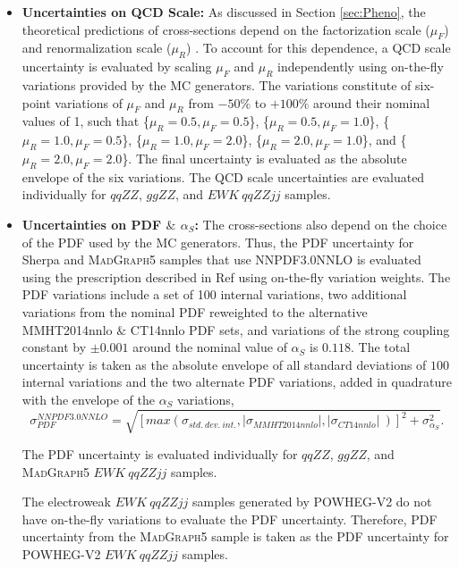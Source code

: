 \begin{itemize}
\item{\textbf{Uncertainties on QCD Scale:} As discussed in Section \ref{sec:Pheno}, the theoretical predictions of cross-sections depend on the factorization scale ($\mu_{F}$) and renormalization scale ($\mu_{R}$) \cite{QCDScaleAndPDFUnc}. To account for this dependence, a QCD scale uncertainty is evaluated by scaling $\mu_{F}$ and $\mu_{R}$ independently using on-the-fly variations provided by the MC generators. The variations constitute of six-point variations of $\mu_{F}$ and $\mu_{R}$ from $-50\%$ to $+100\%$ around their nominal values of 1, such that \{$\mu_R = 0.5, \mu_F = 0.5$\}, \{$\mu_R = 0.5, \mu_F = 1.0$\}, \{$\mu_R = 1.0, \mu_F = 0.5$\}, \{$\mu_R = 1.0, \mu_F = 2.0$\}, \{$\mu_R = 2.0, \mu_F = 1.0$\}, and \{$\mu_R = 2.0, \mu_F = 2.0$\}. The final uncertainty is evaluated as the absolute envelope of the six variations. The QCD scale uncertainties are evaluated individually for $qqZZ$, $ggZZ$, and $EWK~ qqZZjj$ samples.
}
\item{\textbf{Uncertainties on PDF $\&$ $\alpha_{S}$:} The cross-sections also depend on the choice of the PDF used by the MC generators. Thus, the PDF uncertainty for Sherpa and \textsc{MadGraph5} samples that use NNPDF3.0NNLO is evaluated using the prescription described in Ref \cite{PDFForRunII} using on-the-fly variation weights. The PDF variations include a set of 100 internal variations, two additional variations from the nominal PDF reweighted to the alternative MMHT2014nnlo \cite{MMHT2014PDFs} $\&$ CT14nnlo \cite{CT14nnlo} PDF sets, and variations of the strong coupling constant by $\pm0.001$ around the nominal value of $\alpha_{S}$ is $0.118$. The total uncertainty is taken as the absolute envelope of all standard deviations of $100$ internal variations and the two alternate PDF variations, added in quadrature with the envelope of the $\alpha_{S}$ variations, 
\begin{equation}
    \sigma_{PDF}^{NNPDF3.0NNLO} = \sqrt{ [ max (\sigma_{std.~dev.~int.}, |\sigma_{MMHT2014nnlo}| , |\sigma_{CT14nnlo}|~)]^2 + \sigma_{\alpha_S}^2 }.
\end{equation}

The PDF uncertainty is evaluated individually for $qqZZ$, $ggZZ$, and \textsc{MadGraph5} $EWK~ qqZZjj$ samples.

The electroweak $EWK~qqZZjj$ samples generated by \textsc{POWHEG-V2} do not have on-the-fly variations to evaluate the PDF uncertainty. Therefore, PDF uncertainty from the \textsc{MadGraph5} sample is taken as the PDF uncertainty for \textsc{POWHEG-V2} $EWK~qqZZjj$ samples.
}


\end{itemize}
